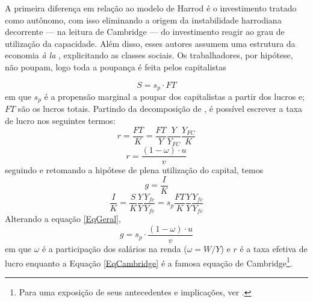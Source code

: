 A primeira diferença em relação ao modelo de Harrod é o investimento tratado como autônomo, com isso eliminando a origem da instabilidade harrodiana decorrente --- na leitura de Cambridge --- do investimento reagir ao grau de utilização da capacidade.
Além disso, esses autores assumem uma estrutura da economia \textit{à la} \textcite{kalecki_theory_1954}, explicitando as classes sociais. Os trabalhadores, por hipótese, não poupam, logo toda a poupança é feita pelos capitalistas

$$
S = s_p\cdot FT
$$
em que $s_p$ é a propensão marginal a poupar dos capitalistas a partir dos lucros e; $FT$ são os lucros totais. Partindo da decomposição de \textcite{weisskopf_marxian_1979}, é possível escrever a taxa de lucro nos seguintes termos:
$$
r = \frac{FT}{K} = \frac{FT}{Y}\frac{Y}{Y_{FC}}\frac{Y_{FC}}{K}
$$ 
\begin{equation}
\label{LucroCambridge}
r = \frac{(1-\omega)\cdot u}{v}
\end{equation}
seguindo \textcite{serrano_trouble_2017} e retomando a hipótese de plena utilização do capital, temos
$$
g = \frac{I}{K} 
$$
$$
\frac{I}{K} = \frac{S}{K}\frac{Y}{Y}\frac{Y_{fc}}{Y_{fc}} = s_p\frac{FT}{K}\frac{Y}{Y}\frac{Y_{fc}}{Y_{fc}}
$$
Alterando a equação \ref{EqGeral}, 
\begin{equation}
g = s_p\cdot \frac{(1-\omega)\cdot u}{v}
\end{equation}
em que $\omega$ é a participação dos salários na renda ($\omega = W/Y$) e $r$ é a taxa efetiva de lucro enquanto a Equação \ref{EqCambridge} é a famosa equação de Cambridge\footnote{
	Para uma exposição de seus antecedentes e implicações, ver \textcite{bortis_notes_1993}.
}.

